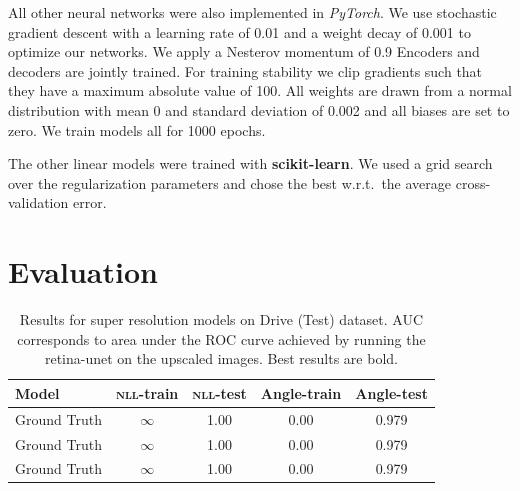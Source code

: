\documentclass[nobib]{tufte-handout}
\begin{document}
All other neural networks were also implemented in \textit{PyTorch}.
We use stochastic gradient descent with a learning rate of 0.01 and a weight decay of 0.001 to optimize our networks.
We apply a Nesterov momentum of 0.9
Encoders and decoders are jointly trained.
For training stability we clip gradients such that they have a maximum absolute value of 100.
All weights are drawn from a normal distribution with mean 0 and standard deviation of 0.002 and all biases are set to zero.
We train models all for 1000 epochs.


The other linear models were trained with \textbf{scikit-learn}\autocite{scikitLearn}.
We used a grid search over the regularization parameters and chose the best w.r.t.\ the average cross-validation error.

\section{Evaluation}
\begin{table}[htb]
\centering
\caption{Results for super resolution models on Drive (Test) dataset.
  AUC corresponds to area under the ROC curve achieved by running the retina-unet on the upscaled images.
  Best results are bold.
}

\label{tab:results-sr-drive}
\begin{tabular}{@{}lS[table-format=2.2]S[table-format=2.2]S[table-format=2.2]S[table-format=2.3]@{}}
\toprule
{Model} & {\textsc{nll}-train} & {\textsc{nll}-test} & {Angle-train} & {Angle-test} \\ \midrule
Ground Truth & $\infty$ & 1.00 & 0.00 & 0.979 \\
Ground Truth & $\infty$ & 1.00 & 0.00 & 0.979 \\
Ground Truth & $\infty$ & 1.00 & 0.00 & 0.979 \\
\bottomrule
\end{tabular}
\end{table}
\end{document}
